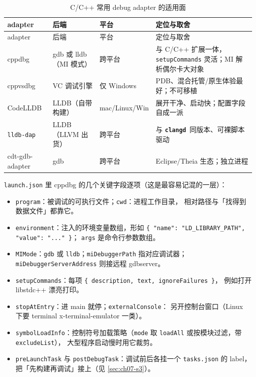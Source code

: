 \documentclass[12pt,a4paper,fontset=fandol]{ctexbook}
\newcommand{\Bk}{\discretionary{}{}{}}
\newcommand{\Lib}[1]{\textbf{\texttt{#1}}}
\newcommand{\CD}{\Lib{clangd}}
\begin{document}
{\small\setlength{\tabcolsep}{3pt}
\begin{longtable}{>{\raggedright\arraybackslash}p{} >{\raggedright\arraybackslash}p{} >{\raggedright\arraybackslash}p{} >{\raggedright\arraybackslash}p{}}
\caption{C/C++ 常用 debug adapter 的适用面}\label{tab:ch07-adapter}\\
\toprule
adapter & 后端 & 平台 & 定位与取舍 \\
\midrule
\endfirsthead
\toprule
adapter & 后端 & 平台 & 定位与取舍 \\
\midrule
\endhead
\bottomrule
\endfoot
cppdbg & gdb 或 lldb（MI 模式） & 跨平台 & 与 C/C++ 扩展一体，\texttt{setupCommands} 灵活；MI 解析偶尔卡大对象 \\
cppvsdbg & VC 调试引擎 & 仅 Windows & PDB、混合托管/原生体验最好；不可移植 \\
CodeLLDB & LLDB（自带构建） & mac/Linux/Win & 展开干净、启动快；配置字段自成一派 \\
\texttt{lldb-dap} & LLDB（LLVM 出货） & 跨平台 & 与 \CD\ 同版本、可裸脚本驱动 \\
cdt-gdb-adapter & gdb & 跨平台 & Eclipse/Theia 生态；独立进程 \\
\end{longtable}}

\texttt{launch.json} 里 cppdbg 的几个关键字段逐项（这是最容易记混的一层）：

\begin{itemize}
  \item \texttt{program}：被调试的可执行文件；\texttt{cwd}：进程工作目录，
        相对路径与「找得到数据文件」都靠它。
  \item \texttt{environment}：注入的环境变量数组，形如
        \texttt{\{ "name": "LD\_LIBRARY\_PATH", "value": "..." \}}；
        \texttt{args} 是命令行参数数组。
  \item \texttt{MIMode}：\texttt{gdb} 或 \texttt{lldb}；\texttt{miDebuggerPath}
        指对应调试器；\texttt{miDebugger}\Bk\texttt{ServerAddress} 则接远程 gdbserver。
  \item \texttt{setupCommands}：每项 \texttt{\{ description, text, ignoreFailures \}}，
        例如打开 libstdc++ 漂亮打印。
  \item \texttt{stopAtEntry}：进 main 就停；\texttt{externalConsole}：
        另开控制台窗口（Linux 下要 terminal x-terminal-emulator 一类）。
  \item \texttt{symbol{\Bk}Load{\Bk}Info}：控制符号加载策略（\texttt{mode} 取
        \texttt{loadAll} 或按模块过滤，带 \texttt{excludeList}），
        大型程序启动慢时用它裁剪。
  \item \texttt{pre{\Bk}Launch{\Bk}Task} 与 \texttt{post{\Bk}Debug{\Bk}Task}：调试前后各挂一个
        \texttt{tasks.json} 的 label，把「先构建再调试」接上（见 \ref{sec:ch07-s3}）。
\end{itemize}
\end{document}
